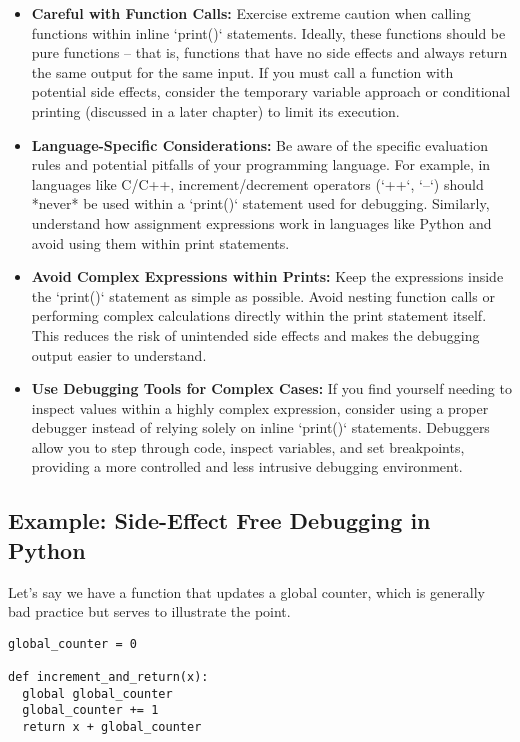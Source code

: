 \documentclass{article}
\begin{document}
{{{{\begin{itemize}
    \item \textbf{Careful with Function Calls:} Exercise extreme caution when calling functions within inline `print()` statements. Ideally, these functions should be pure functions – that is, functions that have no side effects and always return the same output for the same input. If you must call a function with potential side effects, consider the temporary variable approach or conditional printing (discussed in a later chapter) to limit its execution.

    \item \textbf{Language-Specific Considerations:} Be aware of the specific evaluation rules and potential pitfalls of your programming language. For example, in languages like C/C++, increment/decrement operators (`++`, `--`) should *never* be used within a `print()` statement used for debugging.  Similarly, understand how assignment expressions work in languages like Python and avoid using them within print statements.

    \item \textbf{Avoid Complex Expressions within Prints:}  Keep the expressions inside the `print()` statement as simple as possible.  Avoid nesting function calls or performing complex calculations directly within the print statement itself. This reduces the risk of unintended side effects and makes the debugging output easier to understand.

    \item \textbf{Use Debugging Tools for Complex Cases:} If you find yourself needing to inspect values within a highly complex expression, consider using a proper debugger instead of relying solely on inline `print()` statements.  Debuggers allow you to step through code, inspect variables, and set breakpoints, providing a more controlled and less intrusive debugging environment.
\end{itemize}

\subsection*{Example: Side-Effect Free Debugging in Python}

Let's say we have a function that updates a global counter, which is generally bad practice but serves to illustrate the point.

\begin{verbatim}
global_counter = 0

def increment_and_return(x):
  global global_counter
  global_counter += 1
  return x + global_counter


\end{verbatim}}}}}
\end{document}

